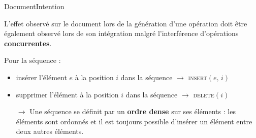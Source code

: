 \begin{frame}{Document}{Intention}
  
  L'effet observé sur le document lors de la génération d'une opération doit
  être également observé lors de son intégration malgré l'interférence
  d'opérations \textbf{concurrentes}.

  \vspace{1cm}


  
  Pour la séquence :
  \begin{itemize}
  \item \og insérer l'élément $e$ à la position $i$ dans la séquence \fg
    $\rightarrow$ \textsc{insert}$(e,\,i)$
  \item \small \og supprimer l'élément à la position $i$ dans la séquence \fg
    $\rightarrow$ \textsc{delete}$(i)$
  \end{itemize}


  \vspace{0.5cm}

  \begin{itemize}
  \item [$\rightarrow$] Une séquence se définit par un \textbf{ordre dense} sur
    ses éléments : les éléments sont ordonnés et il est toujours possible
    d'insérer un élément entre deux autres éléments.
  \end{itemize}

  \vspace{0.2cm}
  
\end{frame}



